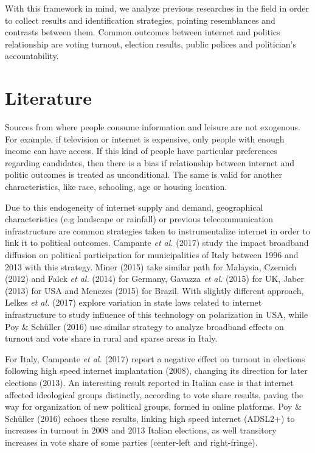 \documentclass[
  12pt,
]{article}
\begin{document}
With this framework in mind, we analyze previous researches in the field
in order to collect results and identification strategies, pointing
resemblances and contrasts between them. Common outcomes between
internet and politics relationship are voting turnout, election results,
public polices and politician's accountability.

\hypertarget{literature}{%
\section{Literature}\label{literature}}

Sources from where people consume information and leisure are not
exogenous. For example, if television or internet is expensive, only
people with enough income can have access. If this kind of people have
particular preferences regarding candidates, then there is a bias if
relationship between internet and politic outcomes is treated as
unconditional. The same is valid for another characteristics, like race,
schooling, age or housing location.

Due to this endogeneity of internet supply and demand, geographical
characteristics (e.g landscape or rainfall) or previous
telecommunication infrastructure are common strategies taken to
instrumentalize internet in order to link it to political outcomes.
Campante \emph{et al.} (2017) study the impact broadband diffusion on
political participation for municipalities of Italy between 1996 and
2013 with this strategy. Miner (2015) take similar path for Malaysia,
Czernich (2012) and Falck \emph{et al.} (2014) for Germany, Gavazza
\emph{et al.} (2015) for UK, Jaber (2013) for USA and Menezes (2015) for
Brazil. With slightly different approach, Lelkes \emph{et al.} (2017)
explore variation in state laws related to internet infrastructure to
study influence of this technology on polarization in USA, while Poy \&
Schüller (2016) use similar strategy to analyze broadband effects on
turnout and vote share in rural and sparse areas in Italy.

For Italy, Campante \emph{et al.} (2017) report a negative effect on
turnout in elections following high speed internet implantation (2008),
changing its direction for later elections (2013). An interesting result
reported in Italian case is that internet affected ideological groups
distinctly, according to vote share results, paving the way for
organization of new political groups, formed in online platforms. Poy \&
Schüller (2016) echoes these results, linking high speed internet
(ADSL2+) to increases in turnout in 2008 and 2013 Italian elections, as
well transitory increases in vote share of some parties (center-left and
right-fringe).
\end{document}
